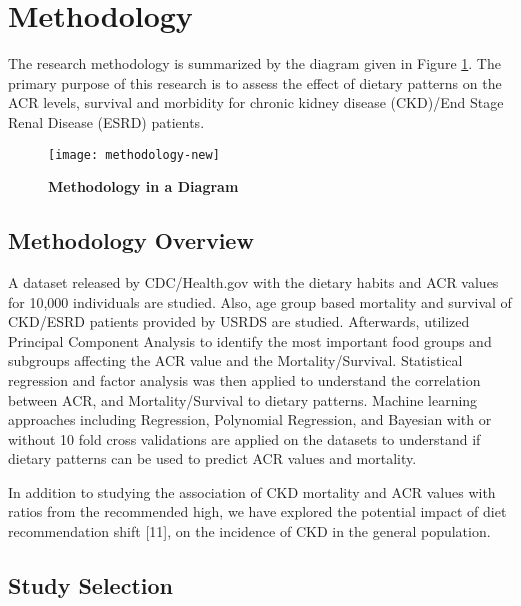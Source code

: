 \section{Methodology}
The research methodology is summarized by the diagram given in Figure \ref{methodology-new}. The primary purpose of this research is to assess the  effect of dietary patterns on the ACR levels, survival and morbidity for chronic kidney disease (CKD)/End Stage Renal Disease (ESRD) patients.

\begin{figure}
\centering
\texttt{[image: methodology-new]}
\caption{\textbf{Methodology in a Diagram}}
\label{methodology-new}
\end{figure}

\subsection{Methodology Overview}
\noindent  A dataset released by CDC/Health.gov with the dietary habits and ACR values for 10,000 individuals are studied. Also, age group based mortality and survival of CKD/ESRD patients provided by USRDS are studied. Afterwards, utilized Principal Component Analysis to identify the most important food groups and subgroups affecting the ACR value and the Mortality/Survival.  Statistical regression and factor analysis was then applied to understand the correlation between ACR, and Mortality/Survival to dietary patterns. Machine learning approaches including Regression, Polynomial Regression, and Bayesian with or without 10 fold cross validations are applied on the datasets to understand if dietary patterns can be used to predict ACR values and mortality. 

\noindent 
In addition to studying the association of CKD mortality and ACR values with ratios from the recommended high, we have explored the potential impact of diet recommendation shift [11], on the incidence of CKD in the general population.

\subsection{Study Selection}

\medskip 

